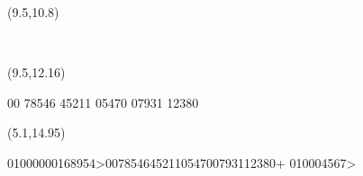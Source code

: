 \documentclass[a4paper,12pt]{letter}
\newenvironment{ocr}{\myfont}{}
\newcommand\refno{00 78546 45211 05470 07931 12380}
\newcommand\refcode{01000000168954>007854645211054700793112380+ 010004567>}
\newcommand\communication{}
\begin{document}
\begin{ocr}
\begin{textblock}{3.9}(9.5,10.8)
\raggedright
\communication\
\end{textblock}

\begin{textblock}{7}(9.5,12.16)
\raggedright
\refno\
\end{textblock}

\begin{textblock}{11}(5.1,14.95)
\raggedright
\refcode\
\end{textblock}

\end{ocr}
\end{document}
